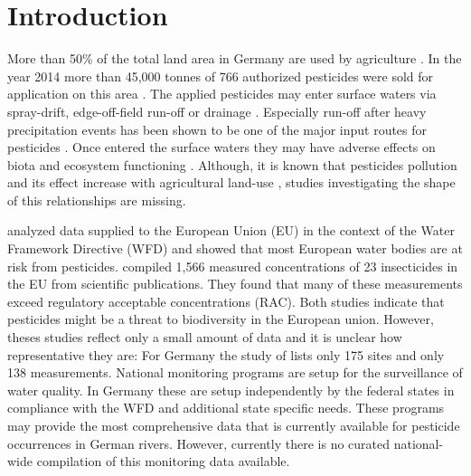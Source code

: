 \documentclass[journal=esthag,manuscript=article]{achemso}
\begin{document}
\section{Introduction}
More than 50\% of the total land area in Germany are used by agriculture \citep{statistisches_bundesamt_bodenflache_2014}.
In the year 2014 more than 45,000 tonnes of 766 authorized pesticides were sold for application on this area \citep{bundesamt_fur_verbraucherschutz_und_lebensmittelsicherheit_absatz_2015}.
The applied pesticides may enter surface waters via spray-drift, edge-off-field run-off or drainage \citep{stehle_probabilistic_2013,schulz_comparison_2001,liess_determination_1999}.
Especially run-off after heavy precipitation events has been shown to be one of the major input routes for pesticides \citep{schulz_field_2004}.
Once entered the surface waters they may have adverse effects on biota and ecosystem functioning \citep{schafer_thresholds_2012}. 
Although, it is known that pesticides pollution and its effect increase with agricultural land-use \citep{schulz_field_2004}, studies investigating the shape of this relationships are missing.

\citet{malaj_organic_2014} analyzed data supplied to the European Union (EU) in the context of the Water Framework Directive (WFD) and showed that most European water bodies are at risk from pesticides.
\citet{stehle_pesticide_2015} compiled 1,566 measured concentrations of 23 insecticides in the EU from scientific publications. 
They found that many of these measurements exceed regulatory acceptable concentrations (RAC).
Both studies indicate that pesticides might be a threat to biodiversity in the European union. 
However, theses studies reflect only a small amount of data and it is unclear how representative they are:
For Germany the study of \citet{malaj_organic_2014} lists only 175 sites and \citet{stehle_pesticide_2015} only 138 measurements. %
National monitoring programs are setup for the surveillance of water quality.
In Germany these are setup independently by the federal states in compliance with the WFD \citep{quevauviller_water_2008} and additional state specific needs. 
These programs may provide the most comprehensive data that is currently available for pesticide occurrences in German rivers.
However, currently there is no curated national-wide compilation of this monitoring data available.
\end{document}
